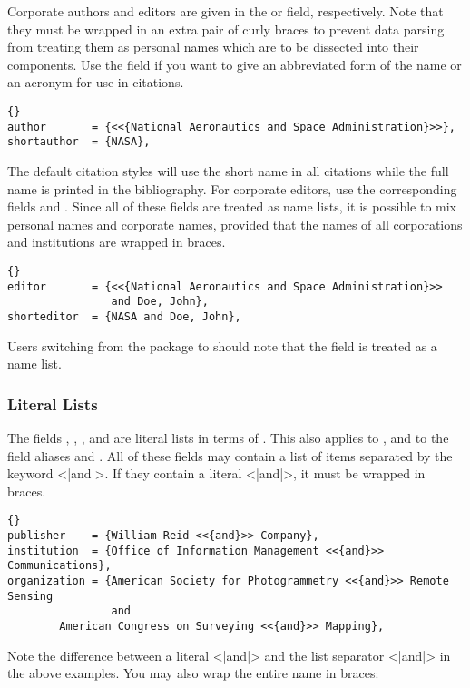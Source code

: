 \documentclass{ltxdockit}[2011/03/25]
\newcommand*{\biblatex}{\sty{biblatex}\xspace}
\begin{document}
Corporate authors and editors are given in the  or  field, respectively. Note that they must be wrapped in an extra pair of curly braces to prevent data parsing from treating them as personal names which are to be dissected into their components. Use the  field if you want to give an abbreviated form of the name or an acronym for use in citations.

\begin{lstlisting}[style=bibtex]{}
author       = {<<{National Aeronautics and Space Administration}>>},
shortauthor  = {NASA},
\end{lstlisting}
%
The default citation styles will use the short name in all citations while the full name is printed in the bibliography. For corporate editors, use the corresponding fields  and . Since all of these fields are treated as name lists, it is possible to mix personal names and corporate names, provided that the names of all corporations and institutions are wrapped in braces.

\begin{lstlisting}[style=bibtex]{}
editor       = {<<{National Aeronautics and Space Administration}>>
                and Doe, John},
shorteditor  = {NASA and Doe, John},
\end{lstlisting}
%
Users switching from the  package to \biblatex should note that the  field is treated as a name list.

\subsubsection{Literal Lists}
\label{bib:use:and}

The fields , , , and  are literal lists in terms of . This also applies to ,  and to the field aliases  and . All of these fields may contain a list of items separated by the keyword <|and|>. If they contain a literal <|and|>, it must be wrapped in braces.

\begin{lstlisting}[style=bibtex]{}
publisher    = {William Reid <<{and}>> Company},
institution  = {Office of Information Management <<{and}>> Communications},
organization = {American Society for Photogrammetry <<{and}>> Remote Sensing
                and
		American Congress on Surveying <<{and}>> Mapping},
\end{lstlisting}
%
Note the difference between a literal <|{and}|> and the list separator <|and|> in the above examples. You may also wrap the entire name in braces:
\end{document}
